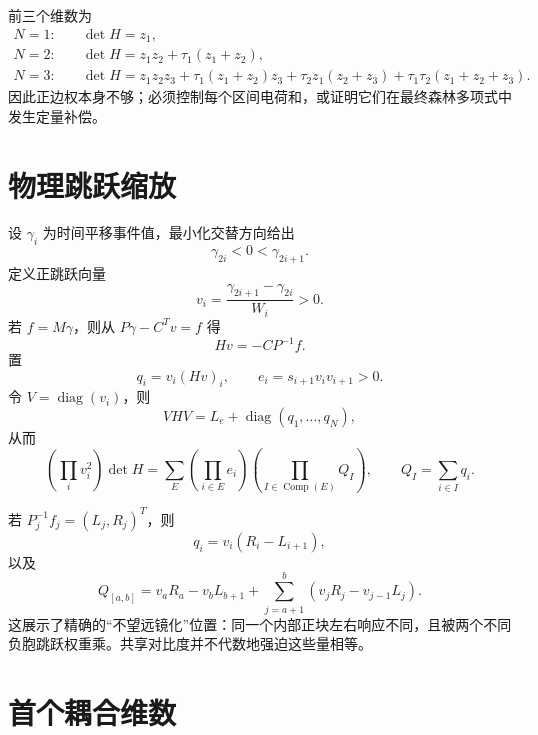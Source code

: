 \documentclass[UTF8,12pt,openany,fontset=fandol]{ctexrep}
\theoremstyle{definition}
\newcommand{\diag}{\operatorname{diag}}
\begin{document}
前三个维数为
\begin{align*}
 N=1:&\quad \det H=z_1,\\
 N=2:&\quad \det H=z_1z_2+\tau_1(z_1+z_2),\\
 N=3:&\quad \det H=z_1z_2z_3+\tau_1(z_1+z_2)z_3
 +\tau_2z_1(z_2+z_3)+\tau_1\tau_2(z_1+z_2+z_3).
\end{align*}
因此正边权本身不够；必须控制每个区间电荷和，或证明它们在最终森林多项式中发生定量补偿。

\section{物理跳跃缩放}

设 $\gamma_i$ 为时间平移事件值，最小化交替方向给出
\begin{equation}
 \gamma_{2i}<0<\gamma_{2i+1}.
\end{equation}
定义正跳跃向量
\begin{equation}
 v_i=\frac{\gamma_{2i+1}-\gamma_{2i}}{W_i}>0.
\end{equation}
若 $f=M\gamma$，则从 $P\gamma-C^Tv=f$ 得
\begin{equation}
 Hv=-CP^{-1}f.
\end{equation}
置
\begin{equation}
 q_i=v_i(Hv)_i,\qquad e_i=s_{i+1}v_iv_{i+1}>0.
\end{equation}
令 $V=\diag(v_i)$，则
\begin{equation}
 VHV=L_e+\diag(q_1,\ldots,q_N),
\end{equation}
从而
\begin{equation}\label{eq:charged-forest}
 \left(\prod_i v_i^2\right)\det H
 =\sum_E\left(\prod_{i\in E}e_i\right)
 \left(\prod_{I\in\operatorname{Comp}(E)}Q_I\right),\qquad
 Q_I=\sum_{i\in I}q_i.
\end{equation}

若 $P_j^{-1}f_j=(L_j,R_j)^T$，则
\begin{equation}
 q_i=v_i(R_i-L_{i+1}),
\end{equation}
以及
\begin{equation}
 Q_{[a,b]}=v_aR_a-v_bL_{b+1}
 +\sum_{j=a+1}^b(v_jR_j-v_{j-1}L_j).
\end{equation}
这展示了精确的“不望远镜化”位置：同一个内部正块左右响应不同，且被两个不同负胞跳跃权重乘。共享对比度并不代数地强迫这些量相等。

\section{首个耦合维数}
\end{document}
